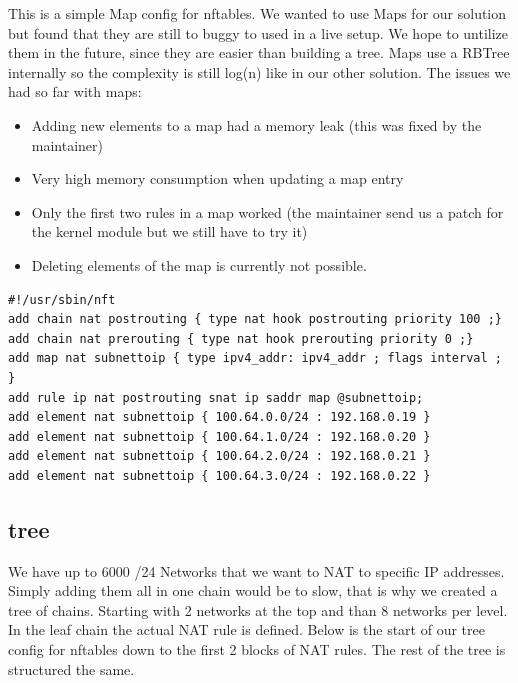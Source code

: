 \documentclass{report}
\begin{document}
This is a simple Map config for nftables. We wanted to use Maps for our
solution but found that they are still to buggy to used in a live setup.
We hope to untilize them in the future, since they are easier than building
a tree. Maps use a RBTree internally so the complexity is still
log(n) like in our other solution. The issues we had so far with maps:

\begin{itemize}
\itemsep1pt\parskip0pt
\item
  Adding new elements to a map had a memory leak (this was fixed by the
  maintainer)
\item
  Very high memory consumption when updating a map entry
\item
  Only the first two rules in a map worked (the maintainer send us a
  patch for the kernel module but we still have to try it)
\item
  Deleting elements of the map is currently not possible.
\end{itemize}

\begingroup
\fontsize{9pt}{9pt}\selectfont
\begin{verbatim}
#!/usr/sbin/nft
add chain nat postrouting { type nat hook postrouting priority 100 ;}
add chain nat prerouting { type nat hook prerouting priority 0 ;}
add map nat subnettoip { type ipv4_addr: ipv4_addr ; flags interval ; }
add rule ip nat postrouting snat ip saddr map @subnettoip;
add element nat subnettoip { 100.64.0.0/24 : 192.168.0.19 }
add element nat subnettoip { 100.64.1.0/24 : 192.168.0.20 }
add element nat subnettoip { 100.64.2.0/24 : 192.168.0.21 }
add element nat subnettoip { 100.64.3.0/24 : 192.168.0.22 }
\end{verbatim}
\endgroup

\subsection{tree}

We have up to 6000 /24 Networks that we want to NAT to specific IP addresses.
Simply adding them all in one chain would be to slow, that is why we
created a tree of chains. Starting with 2 networks at the top and than 8
networks per level. In the leaf chain the actual NAT rule is defined.
Below is the start of our tree config for nftables down to the first 2
blocks of NAT rules. The rest of the tree is structured the same.
\end{document}
